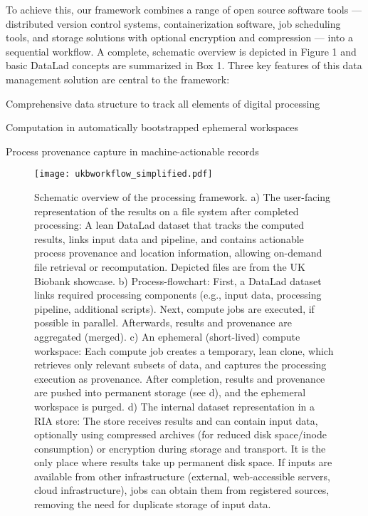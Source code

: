 To achieve this, our framework combines a range of open source software tools — distributed version control systems, containerization software, job scheduling tools, and storage solutions with optional encryption and compression — into a sequential workflow. A complete, schematic overview is depicted in Figure 1 and basic DataLad concepts are summarized in Box 1. Three key features of this data management solution are central to the framework:

Comprehensive data structure to track all elements of digital processing

Computation in automatically bootstrapped ephemeral workspaces

Process provenance capture in machine-actionable records





\begin{figure}
	\centering
	\texttt{[image: ukbworkflow\_simplified.pdf]}
	\caption[Schematic overview of the processing framework]{Schematic overview of the processing framework. a) The user-facing representation of the results on a file system after completed processing: A lean DataLad dataset that tracks the computed results, links input data and pipeline, and contains actionable process provenance and location information, allowing on-demand file retrieval or recomputation. Depicted files are from the UK Biobank showcase. b) Process-flowchart: First, a DataLad dataset links required processing components (e.g., input data, processing pipeline, additional scripts). Next, compute jobs are executed, if possible in parallel. Afterwards, results and provenance are aggregated (merged). c) An ephemeral (short-lived) compute workspace: Each compute job creates a temporary, lean clone, which retrieves only relevant subsets of data, and captures the processing execution as provenance. After completion, results and provenance are pushed into permanent storage (see d), and the ephemeral workspace is purged. d) The internal dataset representation in a RIA store: The store receives results and can contain input data, optionally using compressed archives (for reduced disk space/inode consumption) or encryption during storage and transport. It is the only place where results take up permanent disk space. If inputs are available from other infrastructure (external, web-accessible servers, cloud infrastructure), jobs can obtain them from registered sources, removing the need for duplicate storage of input data.}
	\label{fig:fairly_workflow}
\end{figure}

